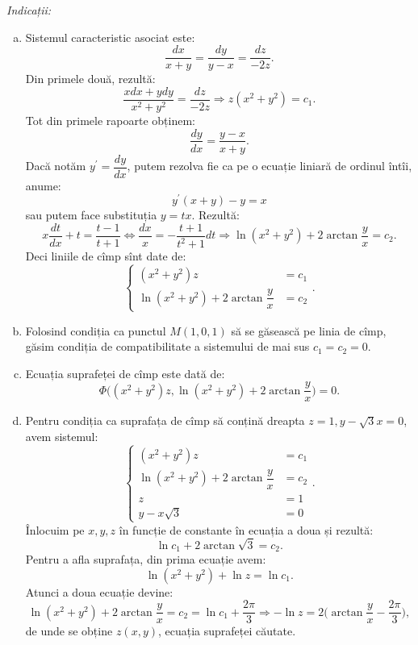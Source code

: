\emph{Indicații:}
\begin{enumerate}[(a)]
    \item Sistemul caracteristic asociat este:
        \[
            \dfrac{dx}{x + y} = \dfrac{dy}{y - x} = \dfrac{dz}{-2z}.
        \]
        Din primele două, rezultă:
        \[
            \dfrac{xdx + ydy}{x^2 + y^2} = \dfrac{dz}{-2z} \Rightarrow %
            z(x^2 + y^2) = c_1.
        \]
        Tot din primele rapoarte obținem:
        \[
            \dfrac{dy}{dx} = \dfrac{y - x}{x + y}.
        \]
        Dacă notăm $ y^\prime = \dfrac{dy}{dx} $, putem rezolva fie ca pe o ecuație liniară
        de ordinul întîi, anume:
        \[
            y^\prime (x + y) - y = x
        \]
        sau putem face substituția $ y = tx $. Rezultă:
        \[
            x \dfrac{dt}{dx} + t = \dfrac{t - 1}{t + 1} \Leftrightarrow %
            \dfrac{dx}{x} = - \dfrac{t + 1}{t^2 + 1} dt \Rightarrow \ln(x^2 + y^2) + 2 \arctan \dfrac{y}{x} = c_2.
        \]
        Deci liniile de cîmp sînt date de:
        \[
            \begin{cases}
                (x^2 + y^2)z &= c_1 \\
                \ln(x^2 + y^2) + 2 \arctan \dfrac{y}{x} &= c_2
            \end{cases}.
        \]
    \item Folosind condiția ca punctul $ M(1, 0, 1) $ să se găsească pe linia de cîmp, găsim
        condiția de compatibilitate a sistemului de mai sus $ c_1 = c_2 = 0 $.
    \item Ecuația suprafeței de cîmp este dată de:
        \[
            \Phi\Big((x^2 + y^2)z, \ln(x^2 + y^2) + 2 \arctan \dfrac{y}{x}\Big) = 0.
        \]
    \item Pentru condiția ca suprafața de cîmp să conțină dreapta $ z = 1, y - \sqrt{3} x = 0 $,
        avem sistemul:
        \[
            \begin{cases}
                (x^2 + y^2)z &= c_1 \\
                \ln(x^2 + y^2) + 2 \arctan \dfrac{y}{x} &= c_2 \\
                z &= 1 \\
                y - x\sqrt{3} &= 0
            \end{cases}.
        \]
        Înlocuim pe $ x , y , z $ în funcție de constante în ecuația a doua și rezultă:
        \[
            \ln c_1 + 2 \arctan \sqrt{3} = c_2.
        \]
        Pentru a afla suprafața, din prima ecuație avem:
        \[
            \ln(x^2 + y^2) + \ln z = \ln c_1.
        \]
        Atunci a doua ecuație devine:
        \[
            \ln(x^2 + y^2) + 2 \arctan \dfrac{y}{x} = c_2 = \ln c_1 + \dfrac{2\pi}{3} \Rightarrow %
            -\ln z = 2 \Big( \arctan \dfrac{y}{x} - \dfrac{2\pi}{3}\Big),
        \]
        de unde se obține $ z(x, y) $, ecuația suprafeței căutate.
\end{enumerate}


